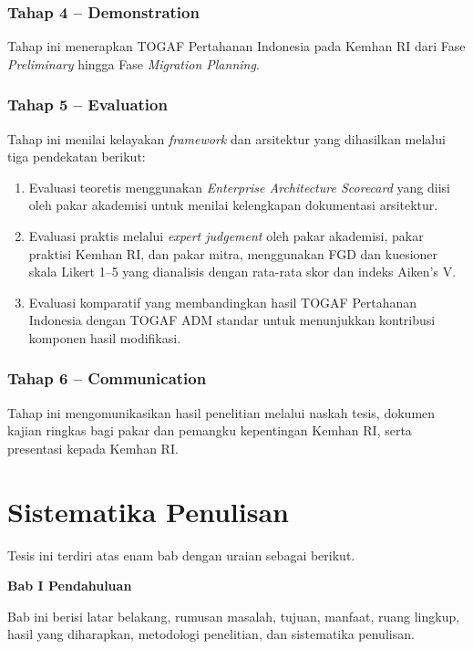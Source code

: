 \subsubsection{Tahap 4 – Demonstration}
\label{sec:I.7.2.4}

Tahap ini menerapkan TOGAF Pertahanan Indonesia pada Kemhan RI dari Fase \textit{Preliminary} hingga Fase \textit{Migration Planning}.

\subsubsection{Tahap 5 – Evaluation}
\label{sec:I.7.2.5}

Tahap ini menilai kelayakan \textit{framework} dan arsitektur yang dihasilkan melalui tiga pendekatan berikut:
\begin{enumerate}[label=\arabic*.]
\item Evaluasi teoretis menggunakan \textit{Enterprise Architecture Scorecard} yang diisi oleh pakar akademisi untuk menilai kelengkapan dokumentasi arsitektur.
\item Evaluasi praktis melalui \textit{expert judgement} oleh pakar akademisi, pakar praktisi Kemhan RI, dan pakar mitra, menggunakan FGD dan kuesioner skala Likert 1–5 yang dianalisis dengan rata-rata skor dan indeks Aiken’s V.
\item Evaluasi komparatif yang membandingkan hasil TOGAF Pertahanan Indonesia dengan TOGAF ADM standar untuk menunjukkan kontribusi komponen hasil modifikasi.
\end{enumerate}

\subsubsection{Tahap 6 – Communication}
\label{sec:I.7.2.6}

Tahap ini mengomunikasikan hasil penelitian melalui naskah tesis, dokumen kajian ringkas bagi pakar dan pemangku kepentingan Kemhan RI, serta presentasi kepada Kemhan RI.

\section{Sistematika Penulisan}
\label{sec:I.8}

Tesis ini terdiri atas enam bab dengan uraian sebagai berikut.

\textbf{Bab I Pendahuluan}

Bab ini berisi latar belakang, rumusan masalah, tujuan, manfaat, ruang lingkup, hasil yang diharapkan, metodologi penelitian, dan sistematika penulisan.


